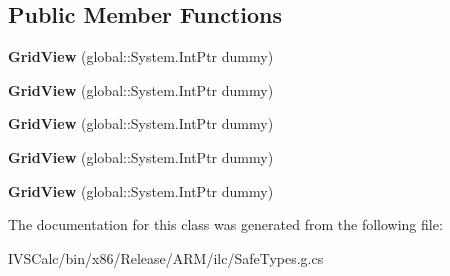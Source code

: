 \subsection*{Public Member Functions}
\begin{DoxyCompactItemize}
\item 
\mbox{\label{class_windows_1_1_u_i_1_1_xaml_1_1_controls_1_1_grid_view_ab41a83c80610f2875c36f7a202ff6fd9}} 
{\bfseries Grid\+View} (global\+::\+System.\+Int\+Ptr dummy)
\item 
\mbox{\label{class_windows_1_1_u_i_1_1_xaml_1_1_controls_1_1_grid_view_ab41a83c80610f2875c36f7a202ff6fd9}} 
{\bfseries Grid\+View} (global\+::\+System.\+Int\+Ptr dummy)
\item 
\mbox{\label{class_windows_1_1_u_i_1_1_xaml_1_1_controls_1_1_grid_view_ab41a83c80610f2875c36f7a202ff6fd9}} 
{\bfseries Grid\+View} (global\+::\+System.\+Int\+Ptr dummy)
\item 
\mbox{\label{class_windows_1_1_u_i_1_1_xaml_1_1_controls_1_1_grid_view_ab41a83c80610f2875c36f7a202ff6fd9}} 
{\bfseries Grid\+View} (global\+::\+System.\+Int\+Ptr dummy)
\item 
\mbox{\label{class_windows_1_1_u_i_1_1_xaml_1_1_controls_1_1_grid_view_ab41a83c80610f2875c36f7a202ff6fd9}} 
{\bfseries Grid\+View} (global\+::\+System.\+Int\+Ptr dummy)
\end{DoxyCompactItemize}


The documentation for this class was generated from the following file\+:\begin{DoxyCompactItemize}
\item 
I\+V\+S\+Calc/bin/x86/\+Release/\+A\+R\+M/ilc/Safe\+Types.\+g.\+cs\end{DoxyCompactItemize}
